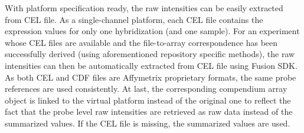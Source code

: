 With platform specification ready, the raw intensities can be easily extracted
from CEL file.
%
As a single-channel platform, each CEL file contains the expression values for
only one hybridization (and one sample).
%
For an experiment whose CEL files are available and the file-to-array
correspondence has been successfully derived (using aforementioned repository
specific methods), the raw intensities can then be automatically extracted
from CEL file using Fusion SDK.
%
As both CEL and CDF files are Affymetrix proprietary formats, the same probe
references are used consistently.
%
At last, the corresponding compendium array object is linked to the virtual
platform instead of the original one to reflect the fact that the probe level
raw intensities are retrieved as raw data instead of the summarized values.
%
If the CEL file is missing, the summarized values are used.
%












